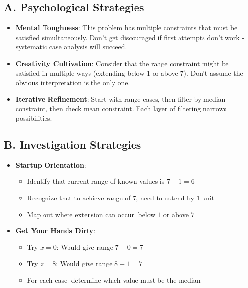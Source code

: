 \documentclass[11pt]{article}
\begin{document}
\begin{strategicbox}
\subsection*{A. Psychological Strategies}
\begin{itemize}[leftmargin=*]
    \item \textbf{Mental Toughness}: This problem has multiple constraints that must be satisfied simultaneously. Don't get discouraged if first attempts don't work - systematic case analysis will succeed.
    
    \item \textbf{Creativity Cultivation}: Consider that the range constraint might be satisfied in multiple ways (extending below 1 or above 7). Don't assume the obvious interpretation is the only one.
    
    \item \textbf{Iterative Refinement}: Start with range cases, then filter by median constraint, then check mean constraint. Each layer of filtering narrows possibilities.
\end{itemize}

\subsection*{B. Investigation Strategies}
\begin{itemize}[leftmargin=*]
    \item \textbf{Startup Orientation}: 
    \begin{itemize}
        \item Identify that current range of known values is $7 - 1 = 6$
        \item Recognize that to achieve range of $7$, need to extend by $1$ unit
        \item Map out where extension can occur: below $1$ or above $7$
    \end{itemize}
    
    \item \textbf{Get Your Hands Dirty}: 
    \begin{itemize}
        \item Try $x = 0$: Would give range $7 - 0 = 7$ \checkmark
        \item Try $z = 8$: Would give range $8 - 1 = 7$ \checkmark
        \item For each case, determine which value must be the median
    \end{itemize}
    

\end{itemize}
\end{strategicbox}
\end{document}
